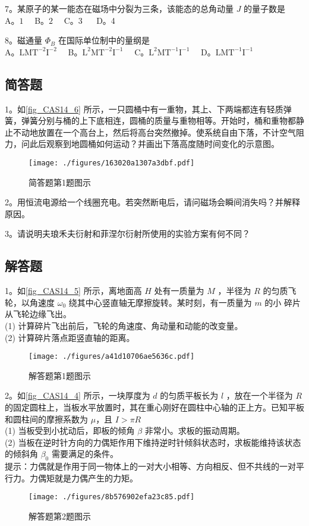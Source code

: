 7。某原子的某一能态在磁场中分裂为三条，该能态的总角动量 $J$ 的量子数是\\
A。$1\quad $ B。$2 \quad$ C。3 $\quad$ D。4

8。磁通量 $\Phi_B$ 在国际单位制中的量纲是\\
A。$\mathrm{LMT^{-2}I^{-2}}\quad$ B。$\mathrm{L^{2}MT^{-2}I^{-1}}\quad$ C。$\mathrm{L^{2}MT^{-1}I^{-1}}\quad$ D。$\mathrm{LMT^{-1}I^{-1}}$

\subsection{简答题}
1。如\autoref{fig_CAS14_6} 所示，一只圆桶中有一重物，其上、下两端都连有轻质弹簧，弹簧分别与桶的上下底相连，圆桶的质量与重物相等。开始时，桶和重物都静止不动地放置在一个高台上，然后将高台突然撤掉。使系统自由下落，不计空气阻力，问此后观察到地圆桶如何运动？并画出下落高度随时间变化的示意图。
\begin{figure}[ht]
\centering
\texttt{[image: ./figures/163020a1307a3dbf.pdf]}
\caption{简答题第1题图示} \label{fig_CAS14_6}
\end{figure}

2。用恒流电源给一个线圈充电。若突然断电后，请问磁场会瞬间消失吗？并解释原因。


3。请说明夫琅禾夫衍射和菲涅尔衍射所使用的实验方案有何不同？


\subsection{解答题}
1。如\autoref{fig_CAS14_5} 所示，离地面高 $H$ 处有一质量为 $M$ ，半径为 $R$ 的匀质飞轮，以角速度 $\omega_0$ 绕其中心竖直轴无摩擦旋转。某时刻，有一质量为 $m$ 的小 碎片从飞轮边缘飞出。\\
(1) 计算碎片飞出前后，飞轮的角速度、角动量和动能的改变量。\\
(2) 计算碎片落点距竖直轴的距离。
\begin{figure}[ht]
\centering
\texttt{[image: ./figures/a41d10706ae5636c.pdf]}
\caption{解答题第1题图示} \label{fig_CAS14_5}
\end{figure}

2。如\autoref{fig_CAS14_4} 所示，一块厚度为 $d$ 的匀质平板长为 $l$ ，放在一个半径为 $R$ 的固定圆柱上，当板水平放置时，其在重心刚好在圆柱中心轴的正上方。已知平板和圆柱间的摩擦系数为 $\mu$，且 $I>\pi R$\\
(1) 当板受到小扰动后，即板的倾角 $\beta$ 非常小。求板的振动周期。\\
(2) 当板在逆时针方向的力偶矩作用下维持逆时针倾斜状态时，求板能维持该状态的倾斜角 $\beta_0$ 需要满足的条件。\\
提示：力偶就是作用于同一物体上的一对大小相等、方向相反、但不共线的一对平行力。力偶矩就是力偶产生的力矩。
\begin{figure}[ht]
\centering
\texttt{[image: ./figures/8b576902efa23c85.pdf]}
\caption{解答题第2题图示} \label{fig_CAS14_4}
\end{figure}

